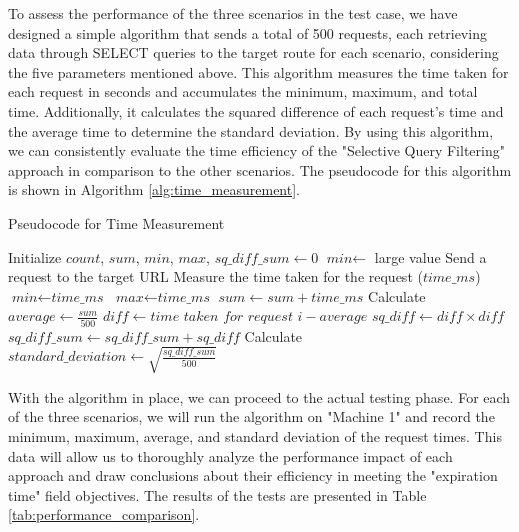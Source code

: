 \documentclass[a4paper,fleqn]{cas-dc}
\begin{document}
To assess the performance of the three scenarios in the test case, we have designed a simple algorithm that sends a total of 500 requests, each retrieving data through SELECT queries to the target route for each scenario, considering the five parameters mentioned above. This algorithm measures the time taken for each request in seconds and accumulates the minimum, maximum, and total time. Additionally, it calculates the squared difference of each request's time and the average time to determine the standard deviation. By using this algorithm, we can consistently evaluate the time efficiency of the "Selective Query Filtering" approach in comparison to the other scenarios. The pseudocode for this algorithm is shown in Algorithm \ref{alg:time_measurement}.

\begin{algorithm}
\caption{Pseudocode for Time Measurement}\label{alg:time_measurement}
\begin{algorithmic}[1]
\State Initialize $\textit{count}$, $\textit{sum}$, $\textit{min}$, $\textit{max}$, $\textit{sq\_diff\_sum} \gets 0$
\State $\textit{min} \gets$ large value
    \State Send a request to the target URL
    \State Measure the time taken for the request ($\textit{time\_ms}$)
        \State $\textit{min} \gets \textit{time\_ms}$
    \EndIf
        \State $\textit{max} \gets \textit{time\_ms}$
    \EndIf
    \State $\textit{sum} \gets \textit{sum} + \textit{time\_ms}$
\EndFor
\State Calculate $\textit{average} \gets \frac{\textit{sum}}{500}$
    \State $\textit{diff} \gets \textit{time taken for request i} - \textit{average}$
    \State $\textit{sq\_diff} \gets \textit{diff} \times \textit{diff}$
    \State $\textit{sq\_diff\_sum} \gets \textit{sq\_diff\_sum} + \textit{sq\_diff}$
\EndFor
\State Calculate $\textit{standard\_deviation} \gets \sqrt{\frac{\textit{sq\_diff\_sum}}{500}}$
\end{algorithmic}
\end{algorithm}

With the algorithm in place, we can proceed to the actual testing phase. For each of the three scenarios, we will run the algorithm on "Machine 1" and record the minimum, maximum, average, and standard deviation of the request times. This data will allow us to thoroughly analyze the performance impact of each approach and draw conclusions about their efficiency in meeting the "expiration time" field objectives. The results of the tests are presented in Table \ref{tab:performance_comparison}.
\end{document}
